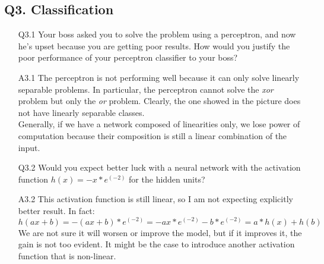 \documentclass[11pt]{scrartcl}
\begin{document}
\subsection*{Q3. Classification}
\begin{itemize}
\item[Q3.1] Your boss asked you to solve the problem using a perceptron, and now he's upset because you are getting poor results. How would you justify the poor performance of your perceptron classifier to your boss?
\item[A3.1] The perceptron is not performing well because it can only solve linearly separable problems. In particular, the perceptron cannot solve the \textit{xor} problem but only the \textit{or} problem. Clearly, the one showed in the picture does not have linearly separable classes. \\
Generally, if we have a network composed of linearities only, we lose power of computation because their composition is still a linear combination of the input.

\item[Q3.2] Would you expect better luck with a neural network with the activation function $h(x) = - x * e^{(-2)}$ for the hidden units?
\item[A3.2] This activation function is still linear, so I am not expecting explicitly better result. In fact:
$$h(ax+b) = -(ax + b)*e^{(-2)} = -ax*e^{(-2)} - b*e^{(-2)} = a*h(x) + h(b)$$
We are not sure it will worsen or improve the model, but if it improves it, the gain is not too evident. It might be the case to introduce another activation function that is non-linear.


\end{itemize}
\end{document}
